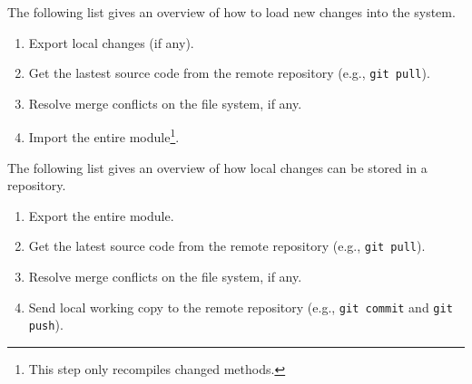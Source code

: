 The following list gives an overview of how to load new changes into the system.
\begin{enumerate}
	\item Export local changes (if any).
	\item Get the lastest source code from the remote repository (e.g., \texttt{git pull}).
	\item Resolve merge conflicts on the file system, if any.
	\item Import the entire module\footnote{This step only recompiles changed methods.}.
\end{enumerate}

The following list gives an overview of how local changes can be stored in a repository.
\begin{enumerate}
	\item Export the entire module.
	\item Get the latest source code from the remote repository (e.g., \texttt{git pull}).
	\item Resolve merge conflicts on the file system, if any.
	\item Send local working copy to the remote repository (e.g., \texttt{git commit} and \texttt{git push}).
\end{enumerate}
